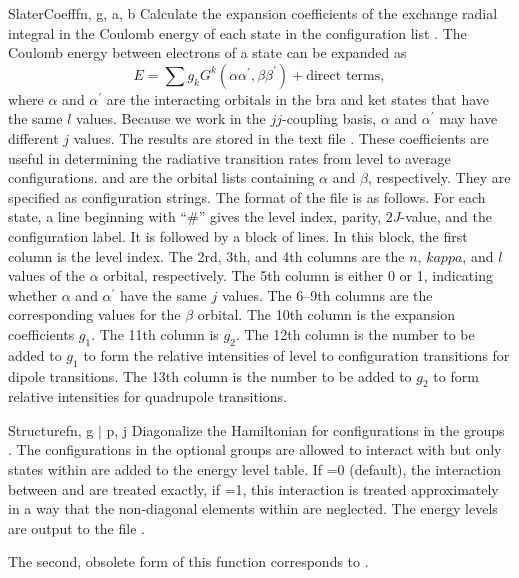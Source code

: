 \begin{fundesc}{SlaterCoeff}{fn, g, a, b}
Calculate the expansion coefficients of the exchange radial integral in the
Coulomb energy of each state in the configuration list  . The Coulomb
energy between electrons of a state can be expanded as
\begin{equation}
E = \sum g_kG^k(\alpha\alpha^\prime,\beta\beta^\prime) + \mbox{direct terms},
\end{equation}
where $\alpha$ and $\alpha^\prime$ are the interacting orbitals in the bra and
ket states that have the same $l$ values. Because we work in the $jj$-coupling
basis, $\alpha$ and $\alpha^\prime$ may have different $j$ values. The results
are stored in the text file . These coefficients are useful in
determining the radiative transition rates from level to average configurations.
 and  are the orbital lists containing $\alpha$ and $\beta$,
respectively. They are specified as configuration strings. The format of the
file is as follows. For each state, a line beginning with ``\#'' gives the level
index, parity, $2J$-value, and the configuration label. It is followed by a
block of lines. In this block, the first column is the level index. The 2rd,
3th, and 4th columns are the $n$, $kappa$, and $l$ values of the $\alpha$
orbital, respectively. The 5th column is either 0 or 1, indicating whether
$\alpha$ and $\alpha^\prime$ have the same $j$ values. The 6--9th  columns are
the corresponding values for the $\beta$ orbital. The 10th column is the
expansion coefficients $g_1$. The 11th column is $g_2$. The 12th column is the
number to be added to $g_1$ to form the relative intensities of level to
configuration transitions for dipole transitions. The 13th column is the number
to be added to $g_2$ to form relative intensities for quadrupole transitions.
\end{fundesc}

\begin{fundesc}{Structure}{fn, g $\mid$ p, j}
Diagonalize the Hamiltonian for configurations in the groups . The
configurations in the optional groups  are allowed to interact with
 but only states within  are added to the energy level table. If
=0 (default), the interaction between  and  are treated
exactly, if =1, this interaction is treated approximately in a way that
the non-diagonal elements within  are neglected. The energy levels are
output to the file .

The second, obsolete form of this function corresponds to
.
\end{fundesc}

